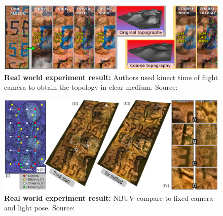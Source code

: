 \documentclass{article}
\begin{document}
\begin{figure}[h!]
\centering
\includegraphics[width=\textwidth]{NBUV_experiment_1.png}
\caption{\textbf{Real world experiment result:} Authors used kinect time of flight camera to obtain the topology in clear medium. Source: \cite{sheinin2016next}}
\label{fig:experiment_1}
\end{figure}

\begin{figure}[h!]
\centering
\includegraphics[width=\textwidth]{NBUV_experiment_2.png}
\caption{\textbf{Real world experiment result:} NBUV compare to fixed camera and light pose. Source: \cite{sheinin2016next}}
\label{fig:experiment_2}
\end{figure}



\end{document}
